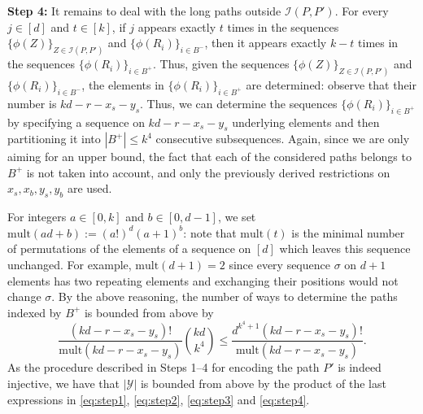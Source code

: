 \documentclass[reqno,final,a4paper]{amsart}
\theoremstyle{definition}
\newcommand{\cI}{\mathcal{I}}
\newcommand{\cY}{\mathcal{Y}}
\newcommand{\mult}{\mathrm{mult}}
\newcommand{\1}{\mathbbm{1}}
\begin{document}
\vspace{0.5em}
\noindent 
\textbf{Step 4:} It remains to deal with the long paths outside $\cI(P,P')$.
For every $j\in [d]$ and $t\in [k]$, if $j$ appears exactly $t$ times in the sequences $\{\phi(Z)\}_{Z\in \cI(P,P')}$ and $\{\phi(R_i)\}_{i\in B^-}$, then it appears exactly $k-t$ times in the sequences $\{\phi(R_i)\}_{i\in B^+}$. 
Thus, given the sequences $\{\phi(Z)\}_{Z\in \cI(P,P')}$ and $\{\phi(R_i)\}_{i\in B^-}$, the elements in $\{\phi(R_i)\}_{i\in B^+}$ are determined: observe that their number is $kd-r-x_s-y_s$. 
Thus, we can determine the sequences $\{\phi(R_i)\}_{i\in B^+}$ by specifying a sequence on $kd-r-x_s-y_s$ underlying elements and then partitioning it into $|B^+|\leq k^4$ consecutive subsequences. 
Again, since we are only aiming for an upper bound, the fact that each of the considered paths belongs to $B^+$ is not taken into account, and only the previously derived restrictions on $x_s,x_b,y_s,y_b$ are used.

For integers $a\in [0,k]$ and $b\in [0,d-1]$, we set $\mult(ad+b):=(a!)^{d}(a+1)^b$: note that $\mult(t)$ is the minimal number of permutations of the elements of a sequence on $[d]$ which leaves this sequence unchanged. 
For example, $\mult(d+1)=2$ since every sequence $\sigma$ on $d+1$ elements has two repeating elements and exchanging their positions would not change $\sigma$.
By the above reasoning, the number of ways to determine the paths indexed by $B^+$ is bounded from above by
\begin{equation}\label{eq:step4}
\frac{(kd-r-x_s-y_s)!}{\mult(kd-r-x_s-y_s)}\binom{kd}{k^4}\leq \frac{d^{k^4+1}(kd-r-x_s-y_s)!}{\mult(kd-r-x_s-y_s)}.
\end{equation}
As the procedure described in Steps 1--4 for encoding the path $P'$ is indeed injective, we have that $|\cY|$ is bounded from above by the product of the last expressions in \eqref{eq:step1}, \eqref{eq:step2}, \eqref{eq:step3} and \eqref{eq:step4}. 
\end{document}
